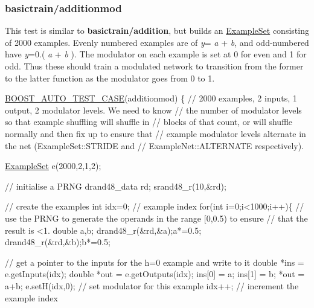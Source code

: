 \subsubsection*{basictrain/additionmod}

This test is similar to {\bfseries basictrain/addition}, but builds an \hyperlink{classExampleSet}{Example\+Set} consisting of 2000 examples. Evenly numbered examples are of {\itshape y}= {\itshape a} + {\itshape b}, and odd-\/numbered have {\itshape y}=0.( {\itshape a} + {\itshape b} ). The modulator on each example is set at 0 for even and 1 for odd. Thus these should train a modulated network to transition from the former to the latter function as the modulator goes from 0 to 1.


\begin{DoxyCodeInclude}

\hyperlink{group__basictests_ga95e163533a64ba72e25fc8dfe7fbf065}{BOOST\_AUTO\_TEST\_CASE}(additionmod) \{
    \textcolor{comment}{// 2000 examples, 2 inputs, 1 output, 2 modulator levels. We need to know}
    \textcolor{comment}{// the number of modulator levels so that example shuffling will shuffle in}
    \textcolor{comment}{// blocks of that count, or will shuffle normally and then fix up to ensure that}
    \textcolor{comment}{// example modulator levels alternate in the net (ExampleSet::STRIDE and}
    \textcolor{comment}{// ExampleNet::ALTERNATE respectively).}
    
    \hyperlink{classExampleSet}{ExampleSet} e(2000,2,1,2);
    
    \textcolor{comment}{// initialise a PRNG}
    drand48\_data rd;
    srand48\_r(10,&rd);
    
    \textcolor{comment}{// create the examples}
    \textcolor{keywordtype}{int} idx=0; \textcolor{comment}{// example index}
    \textcolor{keywordflow}{for}(\textcolor{keywordtype}{int} i=0;i<1000;i++)\{
        \textcolor{comment}{// use the PRNG to generate the operands in the range [0,0.5) to ensure}
        \textcolor{comment}{// that the result is <1.}
        \textcolor{keywordtype}{double} a,b;
        drand48\_r(&rd,&a);a*=0.5;
        drand48\_r(&rd,&b);b*=0.5;
        
        \textcolor{comment}{// get a pointer to the inputs for the h=0 example and write to it}
        \textcolor{keywordtype}{double} *ins = e.getInputs(idx);
        \textcolor{keywordtype}{double} *out = e.getOutputs(idx);
        ins[0] = a;
        ins[1] = b;
        *out = a+b;
        e.setH(idx,0); \textcolor{comment}{// set modulator for this example}
        idx++; \textcolor{comment}{// increment the example index}
        

\end{DoxyCodeInclude}
